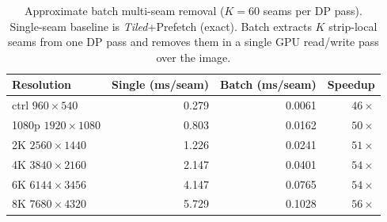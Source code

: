 \begin{table}[h!]
\caption{Approximate batch multi-seam removal ($K{=}60$ seams per DP pass).
Single-seam baseline is \emph{Tiled}+Prefetch (exact).
Batch extracts $K$ strip-local seams from one DP pass and removes them
in a single GPU read/write pass over the image.}
\label{tab:batch}
\centering
\begin{tabular}{@{}lrrr@{}}
\toprule
\textbf{Resolution} & \textbf{Single (ms/seam)} & \textbf{Batch (ms/seam)} & \textbf{Speedup} \\
\midrule
ctrl  $960{\times}540$   & 0.279 & 0.0061 & $46{\times}$ \\
1080p $1920{\times}1080$ & 0.803 & 0.0162 & $50{\times}$ \\
2K    $2560{\times}1440$ & 1.226 & 0.0241 & $51{\times}$ \\
4K    $3840{\times}2160$ & 2.147 & 0.0401 & $54{\times}$ \\
6K    $6144{\times}3456$ & 4.147 & 0.0765 & $54{\times}$ \\
8K    $7680{\times}4320$ & 5.729 & 0.1028 & $56{\times}$ \\
\bottomrule
\end{tabular}
\end{table}
